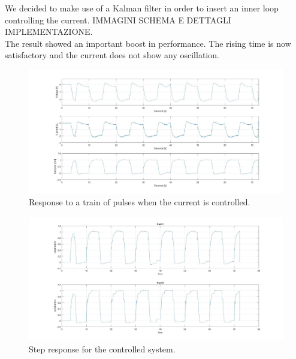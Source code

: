We decided to make use of a Kalman filter in order to insert an inner loop controlling the current. IMMAGINI SCHEMA E DETTAGLI IMPLEMENTAZIONE. \\

The result showed an important boost in performance. The rising time is now satisfactory and the current does not show any oscillation.\\

\begin{figure}[h]
	\centering
	\includegraphics[width=0.9\linewidth]{img/hinf_curr}
	\caption{Response to a train of pulses when the current is controlled.}
	\label{fig:hinfnocurr}
\end{figure}

\begin{figure}[h]
	\centering
	\includegraphics[width=0.9\linewidth]{img/hinf_response}
	\caption{Step response for the controlled system.}
	\label{fig:hinfnocurr}
\end{figure}


